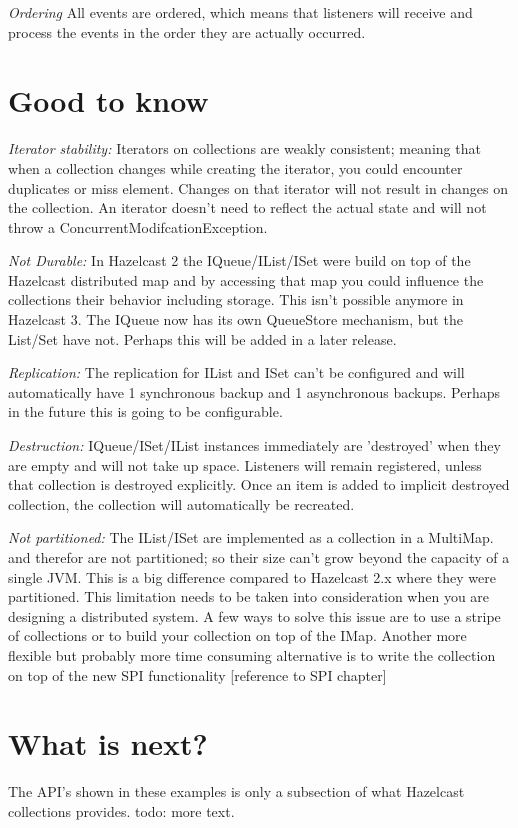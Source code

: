 \emph{Ordering} All events are ordered, which means that listeners will receive and process the events in the order they are actually occurred. 

\section{Good to know}

\emph{Iterator stability:} Iterators on collections are weakly consistent; meaning that when a collection changes while creating the iterator, you could encounter duplicates or miss element. Changes on that iterator will not result in changes on the collection. An iterator doesn't need to reflect the actual state and will not throw a ConcurrentModifcationException. 

\emph{Not Durable:} In Hazelcast 2 the IQueue/IList/ISet were build on top of the Hazelcast distributed map and by accessing that map you could influence the collections their behavior including storage. This isn't possible anymore in Hazelcast 3. The IQueue now has its own QueueStore mechanism, but the List/Set have not. Perhaps this will be added in a later release.

\emph{Replication:} The replication for IList and ISet can't be configured and will automatically have 1 synchronous backup and 1 asynchronous backups. Perhaps in the future this is going to be configurable.

\emph{Destruction:} IQueue/ISet/IList instances immediately are 'destroyed' when they are empty and will not take up space. Listeners will remain registered, unless that collection is destroyed explicitly. Once an item is added to implicit destroyed collection, the collection will automatically be recreated.

\emph{Not partitioned:}  The IList/ISet are implemented as a collection in a MultiMap. and therefor are not partitioned; so their size can't grow beyond the capacity of a single JVM. This is a big difference compared to Hazelcast 2.x where they were partitioned. This limitation needs to be taken into consideration when you are designing a distributed system. A few ways to solve this issue are to use a stripe of collections or to build your collection on top of the IMap. Another more flexible but probably more time consuming alternative is to write the collection on top of the new SPI functionality [reference to SPI chapter]

\section{What is next?}
The API's shown in these examples is only a subsection of what Hazelcast collections provides. todo: more text.